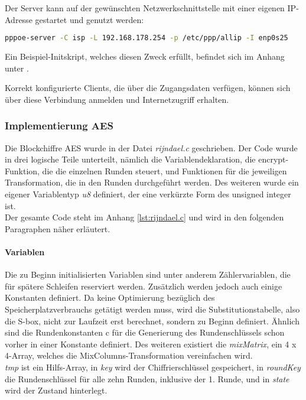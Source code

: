 	Der Server kann auf der gewünschten Netzwerkschnittstelle mit einer eigenen IP-Adresse
	gestartet und genutzt werden:
	\begin{lstlisting}[language=bash]
		pppoe-server -C isp -L 192.168.178.254 -p /etc/ppp/allip -I enp0s25
	\end{lstlisting}

    Ein Beispiel-Initskript, welches diesen Zweck erfüllt, befindet sich im Anhang unter .

        Korrekt konfigurierte Clients, die über die Zugangsdaten verfügen, können sich über
        diese Verbindung anmelden und Internetzugriff erhalten.

	\subsubsection[Implementierung AES (Heumann)]{Implementierung AES}
	\label{implementierung-aes}
	Die Blockchiffre AES wurde in der Datei \emph{rijndael.c} geschrieben. Der Code wurde in drei
	logische Teile unterteilt, nämlich die Variablendeklaration, die encrypt-Funktion, die die
	einzelnen Runden steuert, und Funktionen für die jeweiligen Transformation, die in den Runden
	durchgeführt werden. Des weiteren wurde ein eigener Variablentyp \emph{u8} definiert,
	der eine verkürzte Form des unsigned integer ist. \\
	Der gesamte Code steht im Anhang \ref{lst:rijndael.c} und wird in den folgenden Paragraphen näher erläutert.

		\paragraph{Variablen}
		Die zu Beginn initialisierten Variablen sind unter anderem Zählervariablen, die für spätere Schleifen
		reserviert werden. Zusätzlich werden jedoch auch einige Konstanten definiert. Da keine
		Optimierung bezüglich des Speicherplatzverbrauchs getätigt werden muss, wird die Substitutionstabelle,
		also die S-box, nicht zur Laufzeit erst berechnet, sondern zu Beginn definiert. Ähnlich
		sind die Rundenkonstanten c für die Generierung des Rundenschlüssels schon vorher in einer Konstante
		definiert. Des weiteren existiert die \emph{mixMatrix}, ein 4 x 4-Array, welches die
		MixColumns-Transformation vereinfachen wird. \\
		\emph{tmp} ist ein Hilfs-Array, in \emph{key} wird der Chiffrierschlüssel gespeichert, in \emph{roundKey}
		die Rundenschlüssel für alle zehn Runden, inklusive der 1. Runde, und in \emph{state} wird der Zustand
		hinterlegt. 
 
